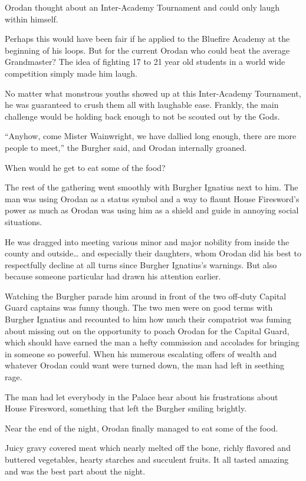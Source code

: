 \documentclass[a4paper,10pt]{book}
\begin{document}
Orodan thought about an Inter-Academy Tournament and could only laugh within himself.\par
Perhaps this would have been fair if he applied to the Bluefire Academy at the beginning of his loops. But for the current Orodan who could beat the average Grandmaster? The idea of fighting 17 to 21 year old students in a world wide competition simply made him laugh.\par
No matter what monstrous youths showed up at this Inter-Academy Tournament, he was guaranteed to crush them all with laughable ease. Frankly, the main challenge would be holding back enough to not be scouted out by the Gods.\par
“Anyhow, come Mister Wainwright, we have dallied long enough, there are more people to meet,” the Burgher said, and Orodan internally groaned.\par
When would he get to eat some of the food?\par
\par
The rest of the gathering went smoothly with Burgher Ignatius next to him. The man was using Orodan as a status symbol and a way to flaunt House Firesword’s power as much as Orodan was using him as a shield and guide in annoying social situations.\par
He was dragged into meeting various minor and major nobility from inside the county and outside… and especially their daughters, whom Orodan did his best to respectfully decline at all turns since Burgher Ignatius’s warnings. But also because someone particular had drawn his attention earlier.\par
Watching the Burgher parade him around in front of the two off-duty Capital Guard captains was funny though. The two men were on good terms with Burgher Ignatius and recounted to him how much their compatriot was fuming about missing out on the opportunity to poach Orodan for the Capital Guard, which should have earned the man a hefty commission and accolades for bringing in someone so powerful. When his numerous escalating offers of wealth and whatever Orodan could want were turned down, the man had left in seething rage.\par
The man had let everybody in the Palace hear about his frustrations about House Firesword, something that left the Burgher smiling brightly.\par
Near the end of the night, Orodan finally managed to eat some of the food.\par
Juicy gravy covered meat which nearly melted off the bone, richly flavored and buttered vegetables, hearty starches and succulent fruits. It all tasted amazing and was the best part about the night.\par
\end{document}
